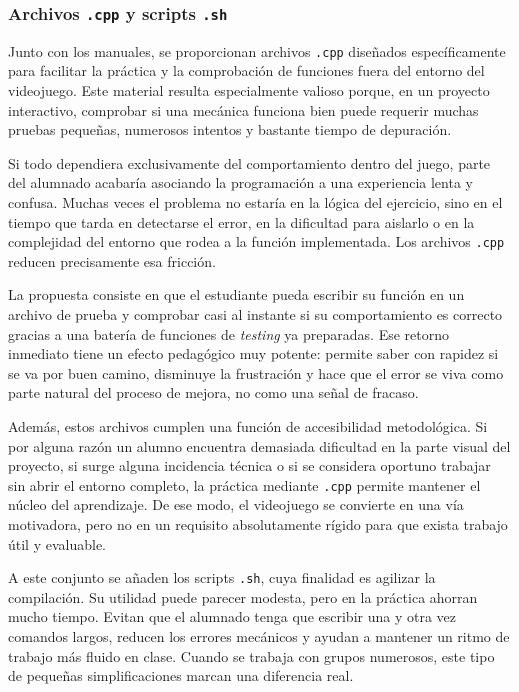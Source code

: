 \documentclass[a4paper,12pt]{article}
\begin{document}
\subsubsection{Archivos \texttt{.cpp} y scripts \texttt{.sh}}

Junto con los manuales, se proporcionan archivos \texttt{.cpp} diseñados específicamente para facilitar la práctica y la comprobación de funciones fuera del entorno del videojuego. Este material resulta especialmente valioso porque, en un proyecto interactivo, comprobar si una mecánica funciona bien puede requerir muchas pruebas pequeñas, numerosos intentos y bastante tiempo de depuración.

Si todo dependiera exclusivamente del comportamiento dentro del juego, parte del alumnado acabaría asociando la programación a una experiencia lenta y confusa. Muchas veces el problema no estaría en la lógica del ejercicio, sino en el tiempo que tarda en detectarse el error, en la dificultad para aislarlo o en la complejidad del entorno que rodea a la función implementada. Los archivos \texttt{.cpp} reducen precisamente esa fricción.

La propuesta consiste en que el estudiante pueda escribir su función en un archivo de prueba y comprobar casi al instante si su comportamiento es correcto gracias a una batería de funciones de \textit{testing} ya preparadas. Ese retorno inmediato tiene un efecto pedagógico muy potente: permite saber con rapidez si se va por buen camino, disminuye la frustración y hace que el error se viva como parte natural del proceso de mejora, no como una señal de fracaso.

Además, estos archivos cumplen una función de accesibilidad metodológica. Si por alguna razón un alumno encuentra demasiada dificultad en la parte visual del proyecto, si surge alguna incidencia técnica o si se considera oportuno trabajar sin abrir el entorno completo, la práctica mediante \texttt{.cpp} permite mantener el núcleo del aprendizaje. De ese modo, el videojuego se convierte en una vía motivadora, pero no en un requisito absolutamente rígido para que exista trabajo útil y evaluable.

A este conjunto se añaden los scripts \texttt{.sh}, cuya finalidad es agilizar la compilación. Su utilidad puede parecer modesta, pero en la práctica ahorran mucho tiempo. Evitan que el alumnado tenga que escribir una y otra vez comandos largos, reducen los errores mecánicos y ayudan a mantener un ritmo de trabajo más fluido en clase. Cuando se trabaja con grupos numerosos, este tipo de pequeñas simplificaciones marcan una diferencia real.
\end{document}
